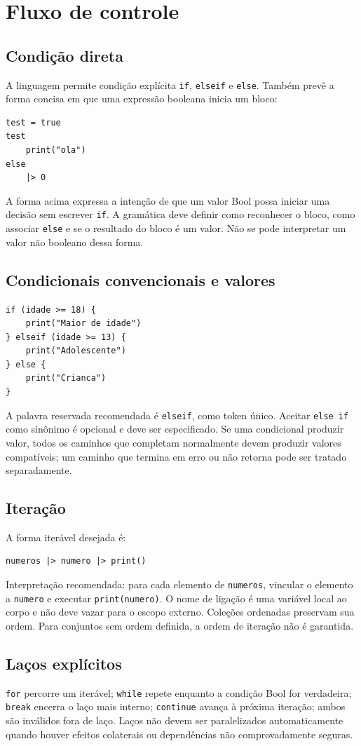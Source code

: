 \documentclass[12pt,a4paper]{article}
\begin{document}
\section{Fluxo de controle}
\subsection{Condição direta}
A linguagem permite condição explícita \texttt{if}, \texttt{elseif} e \texttt{else}. Também prevê a forma concisa em que uma expressão booleana inicia um bloco:
\begin{lstlisting}
test = true
test
    print("ola")
else
    |> 0
\end{lstlisting}
A forma acima expressa a intenção de que um valor Bool possa iniciar uma decisão sem escrever \texttt{if}. A gramática deve definir como reconhecer o bloco, como associar \texttt{else} e se o resultado do bloco é um valor. Não se pode interpretar um valor não booleano dessa forma.
\subsection{Condicionais convencionais e valores}
\begin{lstlisting}
if (idade >= 18) {
    print("Maior de idade")
} elseif (idade >= 13) {
    print("Adolescente")
} else {
    print("Crianca")
}
\end{lstlisting}
A palavra reservada recomendada é \texttt{elseif}, como token único. Aceitar \texttt{else if} como sinônimo é opcional e deve ser especificado. Se uma condicional produzir valor, todos os caminhos que completam normalmente devem produzir valores compatíveis; um caminho que termina em erro ou não retorna pode ser tratado separadamente.
\subsection{Iteração}
A forma iterável desejada é:
\begin{lstlisting}
numeros |> numero |> print()
\end{lstlisting}
Interpretação recomendada: para cada elemento de \texttt{numeros}, vincular o elemento a \texttt{numero} e executar \texttt{print(numero)}. O nome de ligação é uma variável local ao corpo e não deve vazar para o escopo externo. Coleções ordenadas preservam sua ordem. Para conjuntos sem ordem definida, a ordem de iteração não é garantida.
\subsection{Laços explícitos}
\texttt{for} percorre um iterável; \texttt{while} repete enquanto a condição Bool for verdadeira; \texttt{break} encerra o laço mais interno; \texttt{continue} avança à próxima iteração; ambos são inválidos fora de laço. Laços não devem ser paralelizados automaticamente quando houver efeitos colaterais ou dependências não comprovadamente seguras.
\end{document}
